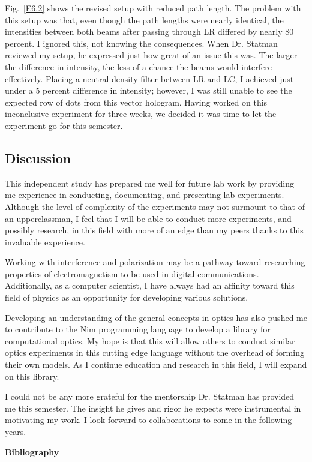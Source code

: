 \documentclass[12pt]{article}
\begin{document}
Fig.~\ref{E6.2} shows the revised setup with reduced path length. The problem with this setup was that, even though the path lengths were nearly identical, the intensities between both beams after passing through LR differed by nearly 80 percent. I ignored this, not knowing the consequences. When Dr. Statman reviewed my setup, he expressed just how great of an issue this was. The larger the difference in intensity, the less of a chance the beams would interfere effectively. Placing a neutral density filter between LR and LC, I achieved just under a 5 percent difference in intensity; however, I was still unable to see the expected row of dots from this vector hologram. Having worked on this inconclusive experiment for three weeks, we decided it was time to let the experiment go for this semester.

\subsection*{Discussion}
This independent study has prepared me well for future lab work by providing me experience in conducting, documenting, and presenting lab experiments. Although the level of complexity of the experiments may not surmount to that of an upperclassman, I feel that I will be able to conduct more experiments, and possibly research, in this field with more of an edge than my peers thanks to this invaluable experience.

Working with interference and polarization may be a pathway toward researching properties of electromagnetism to be used in digital communications. Additionally, as a computer scientist, I have always had an affinity toward this field of physics as an opportunity for developing various solutions.

Developing an understanding of the general concepts in optics has also pushed me to contribute to the Nim programming language to develop a library for computational optics. My hope is that this will allow others to conduct similar optics experiments in this cutting edge language without the overhead of forming their own models. As I continue education and research in this field, I will expand on this library.

I could not be any more grateful for the mentorship Dr. Statman has provided me this semester. The insight he gives and rigor he expects were instrumental in motivating my work. I look forward to collaborations to come in the following years.

\newpage

\begin{center}
  \large{\textbf{Bibliography}}
\end{center}

\printbibliography[heading=none]
\end{document}
